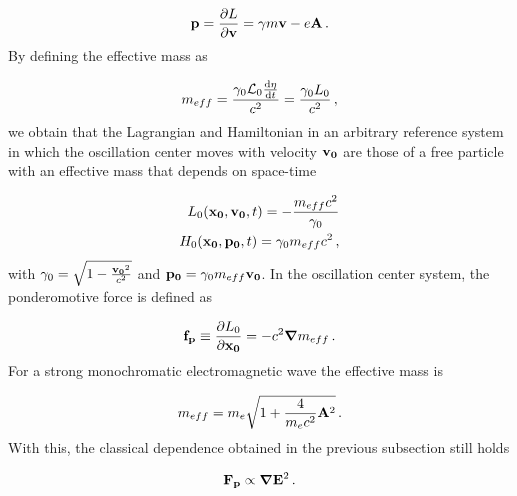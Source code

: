 \documentclass[12pt, class=report, crop=false]{standalone}
\begin{document}
\begin{equation}
  \vb{p} = \pdv{L}{\vb{v}} = \gamma m \vb{v} - e\vb{A}\,.
\end{equation}
By defining the effective mass as

\begin{equation}
  m_{eff} = \frac{\gamma_0 \mathcal{L}_0 \dv{\eta}{t}}{c^2} = \frac{\gamma_0 L_0}{c^2}\,,
\end{equation}
we obtain that the Lagrangian and Hamiltonian in an arbitrary reference system in which the oscillation center moves with velocity \(\vb{v_0}\) are those of a free particle with an effective mass that depends on space-time

\begin{subequations}
  \begin{align}
    L_0 (\vb{x_0},\vb{v_0}, t) = - \frac{m_{eff} c^2}{\gamma_0}\\
    H_0 (\vb{x_0},\vb{p_0}, t) = \gamma_0 m_{eff} c^2\,,
  \end{align}
\end{subequations}
with \(\gamma_0 = \sqrt{1-\frac{\vb{v_0}^2}{c^2}}\) and \(\vb{p_0} = \gamma_0 m_{eff} \vb{v_0}\). In the oscillation center system, the ponderomotive force is defined as

\begin{equation}
  \vb{f_p} \equiv \pdv{L_0}{\vb{x_0}} = -c^2 \grad{m_{eff}}\,.
\end{equation}
For a strong monochromatic electromagnetic wave the effective mass is

\begin{equation}
  m_{eff} = m_e \sqrt{1 + \frac{4}{m_e c^2} \vb{A}^2}\,.
\end{equation}
With this, the classical dependence obtained in the previous subsection still holds

\begin{equation}
  \vb{F_p} \propto \grad{\vb{E}^2}\,.
\end{equation}

\end{document}
